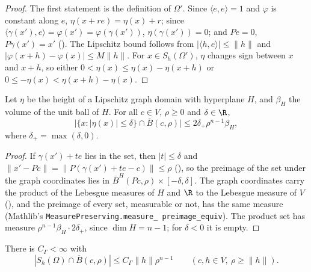 \begin{proof}
\leanok
The first statement is the definition of $\Omega'$. Since $\langle e, e \rangle = 1$ and
$\varphi$ is constant along $e$, $\eta(x + r e) = \eta(x) + r$; since
$\langle \gamma(x'), e \rangle = \varphi(x') = \varphi(\gamma(x'))$, $\eta(\gamma(x')) = 0$; and
$P e = 0$, $P \gamma(x') = x'$ (). The Lipschitz bound follows from
$|\langle h, e \rangle| \leq \|h\|$ and $|\varphi(x + h) - \varphi(x)| \leq M \|h\|$. For
$x \in S_h(\Omega')$, $\eta$ changes sign between $x$ and $x + h$, so either
$0 < \eta(x) \leq \eta(x) - \eta(x + h)$ or $0 \leq -\eta(x) < \eta(x + h) - \eta(x)$.
\end{proof}

\begin{lemma}
\label{lem:graph-slab}
\leanok
{}
Let $\eta$ be the height of a Lipschitz graph domain with hyperplane $H$, and $\beta_H$ the volume
of the unit ball of $H$. For all $c \in V$, $\rho \geq 0$ and $\delta \in \R$,
\[
  \bigl|\{x : |\eta(x)| \leq \delta\} \cap \overline B(c, \rho)\bigr|
  \leq 2 \delta_+ \rho^{n-1} \beta_H ,
\]
where $\delta_+ = \max(\delta, 0)$.
\end{lemma}

\begin{proof}
\leanok
If $\gamma(x') + t e$ lies in the set, then $|t| \leq \delta$ and
$\|x' - Pc\| = \|P(\gamma(x') + t e - c)\| \leq \rho$ (), so the preimage
of the set under the graph coordinates lies in $\overline B^H(Pc, \rho) \times [-\delta, \delta]$.
The graph coordinates carry the product of the Lebesgue measures of $H$ and $\R$ to the Lebesgue
measure of $V$ (), and the preimage of every set, measurable or not, has the
same measure (Mathlib's \texttt{MeasurePreserving.\allowbreak measure\_\allowbreak
preimage\_\allowbreak equiv}). The product set has measure $\rho^{n-1} \beta_H \cdot 2\delta_+$,
since $\dim H = n - 1$; for $\delta < 0$ it is empty.
\end{proof}

\begin{lemma}
\label{lem:boundary-layer-volume}
\leanok
{}
There is $C_\Gamma < \infty$ with
\[
  |S_h(\Omega) \cap \overline B(c, \rho)| \leq C_\Gamma \|h\| \rho^{n-1}
  \qquad (c, h \in V,\ \rho \geq \|h\|) .
\]
\end{lemma}

